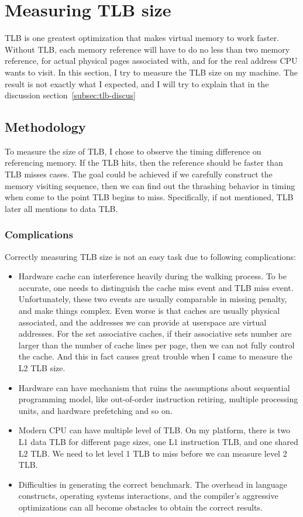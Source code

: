 \section{Measuring TLB size}
	\label{sec:tlb}
TLB is one greatest optimization that makes virtual memory to work faster.
Without TLB, each memory reference will have to do no less than two memory
reference, for actual physical pages associated with, and for the real address
CPU wants to visit. In this section, I try to measure the TLB size on my
machine. The result is not exactly what I expected, and I will try to explain that in the discussion section~\ref{subsec:tlb-discus}

\subsection{Methodology}
To measure the size of TLB, I chose to observe the timing difference on referencing
memory. If the TLB hits, then the reference should be faster than TLB misses
cases. The goal could be achieved if we carefully construct the memory visiting
sequence, then we can find out the thrashing behavior in timing when come to the
point TLB begins to miss. Specifically, if not mentioned, TLB later all
mentions to data TLB.

\subsubsection{Complications}
Correctly measuring TLB size is not an easy task due to following complications:

\begin{itemize}
\item Hardware cache can interference heavily during the walking process. To
be accurate, one needs to distinguish the cache miss event and
TLB miss event. Unfortunately, these two events are usually comparable in missing
penalty, and make things complex. Even worse is that caches are usually physical
associated, and the addresses we can provide at userspace are virtual addresses.
For the set associative caches, if their associative sets number are larger than
the number of cache lines per page, then we can not fully control the cache. And
this in fact causes great trouble when I came to measure the L2 TLB size.
\item Hardware can have mechanism that ruins the assumptions about sequential
programming model, like out-of-order instruction retiring, multiple processing
units, and hardware prefetching and so on.
\item Modern CPU can have multiple level of TLB. On my platform, there is two
L1 data TLB for different page sizes, one L1 instruction TLB, and one shared L2
TLB. We need to let level 1 TLB to miss before we can measure level 2 TLB.
\item Difficulties in generating the correct benchmark. The overhead in
language constructs, operating systems interactions, and the compiler's
aggressive optimizations can all become obstacles to obtain the correct results.
\end{itemize}

